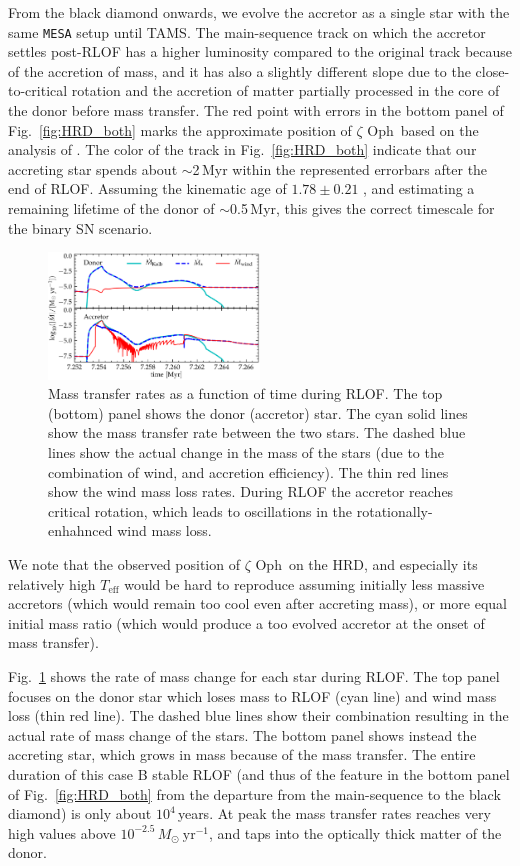 \documentclass[twocolumn,twocolappendix,trackchanges]{aastex63}
\DeclareRobustCommand{\Figref}[1]{Fig.~\ref{#1}}
\newcommand{\zoph}{$\zeta$ Oph}
\begin{document}
From the black diamond onwards, we evolve the accretor as a single star with the same \texttt{MESA} setup until TAMS. The main-sequence track on which the accretor settles post-RLOF has a higher luminosity compared to the original track because of the accretion of mass, and it has also a slightly different slope due to the close-to-critical rotation and the accretion of matter partially processed in the core of the donor before mass transfer. The red point with errors in the bottom panel of \Figref{fig:HRD_both} marks the approximate position of \zoph\ based on the analysis of \cite{villamariz:05}. The color of the track in \Figref{fig:HRD_both} indicate that our accreting star spends about
$\sim$2\,Myr within the represented errorbars after the end of RLOF. Assuming the kinematic age of
$1.78\pm0.21$ \citep{neuhauser:20}, and estimating a remaining lifetime of the donor of
$\sim$0.5\,Myr, this gives the correct timescale for the binary SN scenario.

\begin{figure}[htbp]
  \includegraphics[width=0.5\textwidth]{MT}
  \caption{Mass transfer rates as a function of time during RLOF. The top (bottom) panel
    shows the donor (accretor) star. The cyan solid lines show the
    mass transfer rate between the two stars. The dashed blue lines
    show the actual change in the mass of the stars (due to the
    combination of wind, and accretion efficiency). The thin red
    lines show the wind mass loss rates. During RLOF the accretor
    reaches critical rotation, which leads to oscillations in the
    rotationally-enhahnced wind mass loss.}
  \label{fig:MT}
\end{figure}


We note that the observed position of \zoph\ on the HRD, and especially
its relatively high $T_\mathrm{eff}$ would be hard to reproduce
assuming initially less massive accretors (which would remain too cool
even after accreting mass), or more equal initial mass ratio (which
would produce a too evolved accretor at the onset of mass transfer).

\Figref{fig:MT} shows the rate of mass change for each star
during RLOF. The top panel focuses on the donor star
which loses mass to RLOF (cyan line) and wind mass loss (thin red
line). The dashed blue lines show their combination resulting in the
actual rate of mass change of the stars.
The bottom panel shows instead the accreting star, which grows in mass
because of the mass transfer. The entire duration of this case B
stable RLOF (and thus of the feature in the bottom panel of
\Figref{fig:HRD_both} from the departure from the main-sequence to the
black diamond) is only about $10^4$\,years. At peak the mass transfer rates reaches very high
values above $10^{-2.5}\,M_\odot\ \mathrm{yr^{-1}}$, and taps into the
optically thick matter of the donor.
\end{document}
